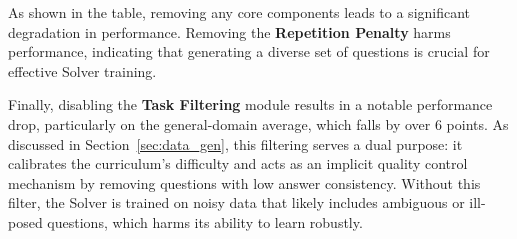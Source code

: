 As shown in the table, removing any core components leads to a significant degradation in performance. 
Removing the \textbf{Repetition Penalty} harms performance, indicating that generating a diverse set of questions is crucial for effective Solver training. 

Finally, disabling the \textbf{Task Filtering} module results in a notable performance drop, particularly on the general-domain average, which falls by over 6 points. As discussed in Section~\ref{sec:data_gen}, this filtering serves a dual purpose: it calibrates the curriculum's difficulty and acts as an implicit quality control mechanism by removing questions with low answer consistency. Without this filter, the Solver is trained on noisy data that likely includes ambiguous or ill-posed questions, which harms its ability to learn robustly.






